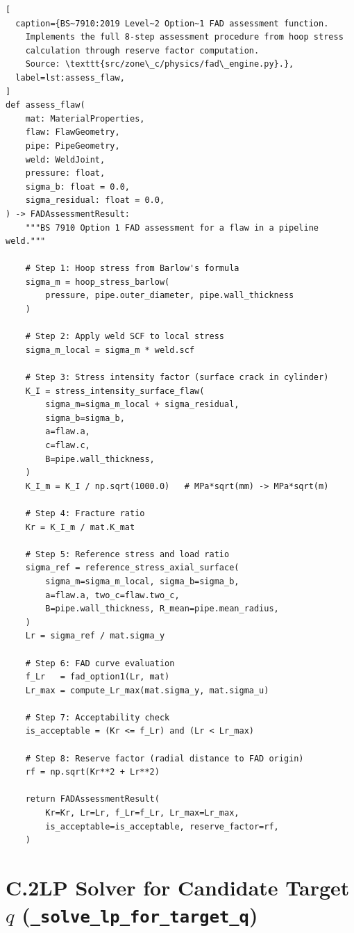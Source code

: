 \begin{lstlisting}[
  caption={BS~7910:2019 Level~2 Option~1 FAD assessment function.
    Implements the full 8-step assessment procedure from hoop stress
    calculation through reserve factor computation.
    Source: \texttt{src/zone\_c/physics/fad\_engine.py}.},
  label=lst:assess_flaw,
]
def assess_flaw(
    mat: MaterialProperties,
    flaw: FlawGeometry,
    pipe: PipeGeometry,
    weld: WeldJoint,
    pressure: float,
    sigma_b: float = 0.0,
    sigma_residual: float = 0.0,
) -> FADAssessmentResult:
    """BS 7910 Option 1 FAD assessment for a flaw in a pipeline weld."""

    # Step 1: Hoop stress from Barlow's formula
    sigma_m = hoop_stress_barlow(
        pressure, pipe.outer_diameter, pipe.wall_thickness
    )

    # Step 2: Apply weld SCF to local stress
    sigma_m_local = sigma_m * weld.scf

    # Step 3: Stress intensity factor (surface crack in cylinder)
    K_I = stress_intensity_surface_flaw(
        sigma_m=sigma_m_local + sigma_residual,
        sigma_b=sigma_b,
        a=flaw.a,
        c=flaw.c,
        B=pipe.wall_thickness,
    )
    K_I_m = K_I / np.sqrt(1000.0)   # MPa*sqrt(mm) -> MPa*sqrt(m)

    # Step 4: Fracture ratio
    Kr = K_I_m / mat.K_mat

    # Step 5: Reference stress and load ratio
    sigma_ref = reference_stress_axial_surface(
        sigma_m=sigma_m_local, sigma_b=sigma_b,
        a=flaw.a, two_c=flaw.two_c,
        B=pipe.wall_thickness, R_mean=pipe.mean_radius,
    )
    Lr = sigma_ref / mat.sigma_y

    # Step 6: FAD curve evaluation
    f_Lr   = fad_option1(Lr, mat)
    Lr_max = compute_Lr_max(mat.sigma_y, mat.sigma_u)

    # Step 7: Acceptability check
    is_acceptable = (Kr <= f_Lr) and (Lr < Lr_max)

    # Step 8: Reserve factor (radial distance to FAD origin)
    rf = np.sqrt(Kr**2 + Lr**2)

    return FADAssessmentResult(
        Kr=Kr, Lr=Lr, f_Lr=f_Lr, Lr_max=Lr_max,
        is_acceptable=is_acceptable, reserve_factor=rf,
    )
\end{lstlisting}

\section*{C.2\quad LP Solver for Candidate Target $q$ (\texttt{\_solve\_lp\_for\_target\_q})}

